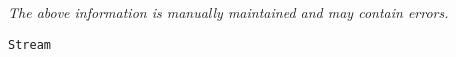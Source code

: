 \label{pkg:stream}

{\tiny \it The above information is manually maintained and may contain errors.}
\begin{verbatim}
Stream
\end{verbatim}
